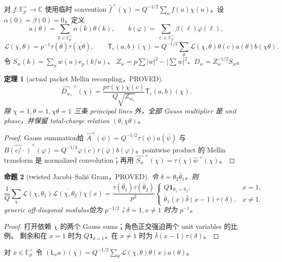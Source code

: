 \documentclass[11pt,a4paper]{ctexart}
\newtheorem{theorem}{定理}[section]
\newtheorem{proposition}[theorem]{命题}
\theoremstyle{definition}
\newcommand{\e}{\mathrm e}
\newcommand{\1}{\mathbf 1}
\newcommand{\F}{\mathbb F}
\newcommand{\G}{\F_p^\times}
\newcommand{\C}{\mathbb C}
\newcommand{\PROVED}{\textcolor{green!40!black}{\textsf{PROVED}}}
\begin{document}
对 $f:\G\to\C$ 使用临时 convention
$\widehat f^{\,\times}(\chi)=Q^{-1/2}\sum_uf(u)\chi(u)$。设
$\alpha(0)=\beta(0)=0$，定义
\[
 a(\theta)=\sum_{k\in\G}\alpha(k)\theta(k),\qquad
 b(\varphi)=\sum_{\ell\in\G}\beta(\ell)\varphi(\ell),
\]
\[
 \mathcal L(\chi,\theta)=p^{-1}\tau(\bar\theta)
 \tau(\overline{\chi\theta}),\qquad
 \mathsf T_c(a,b)(\chi)=Q^{-1/2}\sum_\theta
 \mathcal L(\chi,\theta)\theta(c)a(\theta)b(\chi\theta).\tag{CJS.0}
\]
令
$S_w(k)=\sum_uw(u)\e_p(k/u)$、
$Z_w=p\sum|w|^2-|\sum w|^2$、$D_w=Z_w^{-1/2}S_w$。

\begin{theorem}[actual packet Mellin recoupling，\PROVED]
\[
 \boxed{\widehat{D_{w_c}}^{\,\times}(\chi)
 =\frac{p\tau(\chi)\chi(c)}{Q\sqrt{Z_{w_c}}}
 \mathsf T_c(a,b)(\chi).}                            \tag{CJS.1}
\]
除 $\chi=1,\theta=1,\chi\theta=1$ 三条 principal lines 外，全部 Gauss
multiplier 是 unit phase，并保留 total-charge relation $(\theta,\chi\theta)$。
\end{theorem}
\begin{proof}
Gauss summation给
$\widehat A^\times(\psi)=Q^{-1/2}\tau(\psi)a(\bar\psi)$ 与
$\widehat{B(c/\cdot)}^\times(\varphi)=Q^{-1/2}\varphi(c)
\tau(\bar\varphi)b(\varphi)$。pointwise product 的 Mellin transform 是
normalized convolution；再用
$\widehat{S_w}^{\,\times}(\chi)=\tau(\chi)\widehat w^{\,\times}(\chi)$。
\end{proof}

\begin{proposition}[twisted Jacobi--Sali\'e Gram，\PROVED]
令 $\delta=\theta_2\bar\theta_1$。则
\[
 \frac1Q\sum_\chi\mathcal L(\chi,\theta_1)
 \overline{\mathcal L(\chi,\theta_2)}\chi(x)
 =\frac{\tau(\bar\theta_1)\overline{\tau(\bar\theta_2)}}{p^2}
 \begin{cases}
 Q\1_{\theta_1=\theta_2},&x=1,\\
 \bar\theta_1(x)\bar\delta(x-1)\tau(\delta),&x\ne1.
 \end{cases}                                         \tag{CJS.2}
\]
generic off-diagonal modulus恰为 $p^{-1/2}$；$\delta=1,x\ne1$ 时为 $p^{-1}$。
\end{proposition}
\begin{proof}
打开依赖 $\chi$ 的两个 Gauss sums；角色正交强迫两个 unit variables 的比例。
剩余和在 $x=1$ 时为 $Q\1_{\delta=1}$，在 $x\ne1$ 时为
$\bar\delta(x-1)\tau(\delta)$。
\end{proof}

对 $x\in\G$ 令
$(\mathsf L_xa)(\chi)=Q^{-1/2}\sum_\theta
\mathcal L(\chi,\theta)\theta(x)a(\theta)$。
\end{document}

